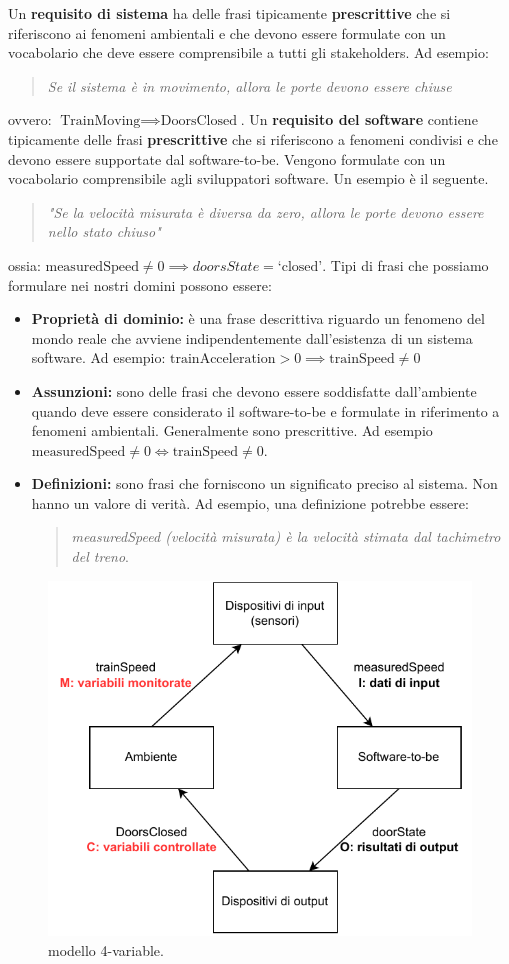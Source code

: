 Un \textbf{requisito di sistema} ha delle frasi tipicamente \textbf{prescrittive} che si riferiscono ai fenomeni ambientali e che devono essere formulate con un vocabolario che deve essere comprensibile a tutti gli stakeholders. Ad esempio:
\begin{quotation}
	\textit{Se il sistema è in movimento, allora le porte devono essere chiuse}
\end{quotation}
ovvero: $\text{TrainMoving} \implies \text{DoorsClosed}$.
Un \textbf{requisito del software} contiene tipicamente delle frasi \textbf{prescrittive} che si riferiscono a fenomeni condivisi e che devono essere supportate dal software-to-be. Vengono formulate con un vocabolario comprensibile agli sviluppatori software. Un esempio è il seguente.
\begin{quotation}
	\textit{"Se la velocità misurata è diversa da zero, allora le porte devono essere nello stato chiuso"}
\end{quotation}
ossia: $\text{measuredSpeed}\ne 0 \implies doorsState = \text{`closed'}$.
Tipi di frasi che possiamo formulare nei nostri domini possono essere:
\begin{itemize}
	\item \textbf{Proprietà di dominio:} è una frase descrittiva riguardo un fenomeno del mondo reale che avviene indipendentemente dall'esistenza di un sistema software.
	Ad esempio: $\text{trainAcceleration} > 0 \implies \text{trainSpeed} \ne 0$
	\item \textbf{Assunzioni:} sono delle frasi che devono essere soddisfatte dall'ambiente quando deve essere considerato il software-to-be e formulate in riferimento a fenomeni ambientali. Generalmente sono prescrittive. Ad esempio
	$\text{measuredSpeed} \ne 0 \iff \text{trainSpeed} \ne 0$.
	\item \textbf{Definizioni:} sono frasi che forniscono un significato preciso al sistema. Non hanno un valore di verità. Ad esempio, una definizione potrebbe essere:
	\begin{quotation}
		\textit{measuredSpeed (velocità misurata) è la velocità stimata dal tachimetro del treno}.
	\end{quotation}
\end{itemize}
\begin{figure}[th]
	\centering
	\includegraphics[width=0.7\linewidth]{img/modello-4-variabili.drawio}
	\caption{modello 4-variable.}
	\label{fig:modello-4-variabili}
\end{figure}
